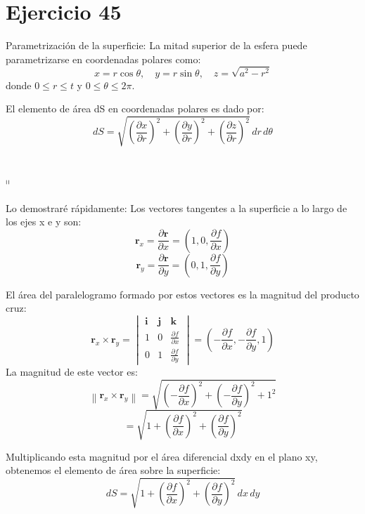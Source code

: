 \section{Ejercicio 45}
Parametrización de la superficie:
La mitad superior de la esfera puede parametrizarse en coordenadas polares como:
\[
   x = r \cos \theta, \quad y = r \sin \theta, \quad z = \sqrt{a^2 - r^2}
   \]
donde \( 0 \leq r \leq t \) y \( 0 \leq \theta \leq 2\pi \).


El elemento de área dS en coordenadas polares es dado por:
\[
   dS = \sqrt{\left( \frac{\partial x}{\partial r} \right)^2 + \left( \frac{\partial y}{\partial r} \right)^2 + \left( \frac{\partial z}{\partial r} \right)^2} \, dr \, d\theta
   \]\\

\hline 
\textit{ }\\
$\shortparallel$ \\\\
Lo demostraré rápidamente: 
Los vectores tangentes a la superficie a lo largo de los ejes x e y son:
\[
   \mathbf{r}_x = \frac{\partial \mathbf{r}}{\partial x} = (1, 0, \frac{\partial f}{\partial x})
   \]
\[
   \mathbf{r}_y = \frac{\partial \mathbf{r}}{\partial y} = (0, 1, \frac{\partial f}{\partial y})
   \]

\noindent El área del paralelogramo formado por estos vectores es la magnitud del producto cruz:
\[
   \mathbf{r}_x \times \mathbf{r}_y = \begin{vmatrix}
   \mathbf{i} & \mathbf{j} & \mathbf{k} \\
   1 & 0 & \frac{\partial f}{\partial x} \\
   0 & 1 & \frac{\partial f}{\partial y}
   \end{vmatrix} = \left(-\frac{\partial f}{\partial x}, -\frac{\partial f}{\partial y}, 1\right)
   \]
La magnitud de este vector es:
\[
   \left\|\mathbf{r}_x \times \mathbf{r}_y\right\| = \sqrt{\left(-\frac{\partial f}{\partial x}\right)^2 + \left(-\frac{\partial f}{\partial y}\right)^2 + 1^2}
   \]
\[
   = \sqrt{1 + \left(\frac{\partial f}{\partial x}\right)^2 + \left(\frac{\partial f}{\partial y}\right)^2}
   \]


Multiplicando esta magnitud por el área diferencial dxdy en el plano xy, obtenemos el elemento de área sobre la superficie:
\[
   dS = \sqrt{1 + \left(\frac{\partial f}{\partial x}\right)^2 + \left(\frac{\partial f}{\partial y}\right)^2} \, dx \, dy
   \]\\
\hline
\textit{ } \\
   
